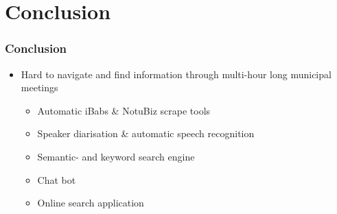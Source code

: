 \documentclass[aspectratio=169,sidebar]{uva-inf-presentation}
\begin{document}
\section{Conclusion}
\begin{frame}\frametitle{Conclusion}
\begin{itemize}
    \item Hard to navigate and find information through multi-hour long municipal meetings
    \begin{itemize}
        \item Automatic iBabs \& NotuBiz scrape tools
        \item Speaker diarisation \& automatic speech recognition
        \item Semantic- and keyword search engine
        \item Chat bot
        \item Online search application
    \end{itemize}
\end{itemize}
\end{frame}

\end{document}
